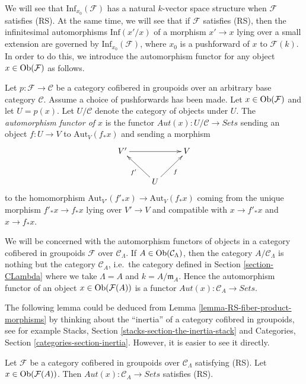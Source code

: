 \noindent
We will see that $\text{Inf}_{x_0}(\mathcal{F})$ has a natural $k$-vector
space structure when $\mathcal{F}$ satisfies (RS). At the same time, we will
see that if $\mathcal{F}$ satisfies (RS), then the infinitesimal automorphisms
$\text{Inf}(x'/x)$ of a morphism $x' \to x$ lying over a small
extension are governed by $\text{Inf}_{x_0}(\mathcal{F})$, where $x_0$ is
a pushforward of $x$ to $\mathcal{F}(k)$. In order to do this, we introduce
the automorphism functor for any object $x \in \mathop{\mathrm{Ob}}\nolimits(\mathcal{F})$ as
follows.

\begin{definition}
\label{definition-automorphism-functor}
Let $p : \mathcal{F} \to \mathcal{C}$ be a category cofibered in groupoids
over an arbitrary base category $\mathcal{C}$. Assume a choice of pushforwards
has been made. Let $x \in \mathop{\mathrm{Ob}}\nolimits(\mathcal{F})$ and let $U = p(x)$.
Let $U/\mathcal{C}$ denote the category of objects under $U$. The
{\it automorphism functor of $x$} is the functor
$\mathit{Aut}(x) : U/\mathcal{C} \to \textit{Sets}$ sending an object
$f : U \to V$ to $\text{Aut}_V(f_*x)$ and sending a morphism
$$
\xymatrix{
V' \ar[rr] &                    & V\\
          & U \ar[ul]^{f'}  \ar[ur]_f &
}
$$
to the homomorphism
$\text{Aut}_{V'}(f'_*x) \to \text{Aut}_V(f_*x)$
coming from the unique morphism $f'_*x \to f_*x$ lying over
$V' \to V$ and compatible with $x \to f'_*x$ and $x \to f_*x$.
\end{definition}

\noindent
We will be concerned with the automorphism functors of objects in a category
cofibered in groupoids $\mathcal{F}$ over $\mathcal{C}_\Lambda$. If
$A \in \mathop{\mathrm{Ob}}\nolimits(\mathcal{C}_\Lambda)$, then the category
$A/\mathcal{C}_\Lambda$ is nothing but the category $\mathcal{C}_A$,
i.e.\ the category defined in Section \ref{section-CLambda}
where we take $\Lambda = A$ and $k = A/\mathfrak m_A$.
Hence the automorphism functor of an object
$x \in \mathop{\mathrm{Ob}}\nolimits(\mathcal{F}(A))$ is a functor
$\mathit{Aut}(x) : \mathcal{C}_A \to \textit{Sets}$.

\medskip\noindent
The following lemma could be deduced from
Lemma \ref{lemma-RS-fiber-product-morphisms}
by thinking about the ``inertia'' of a category cofibred in groupoids,
see for example
Stacks, Section \ref{stacks-section-the-inertia-stack}
and
Categories, Section \ref{categories-section-inertia}.
However, it is easier to see it directly.

\begin{lemma}
\label{lemma-Aut-functor-RS}
Let $\mathcal{F}$ be a category cofibered in groupoids over
$\mathcal{C}_\Lambda$ satisfying (RS). Let
$x \in \mathop{\mathrm{Ob}}\nolimits(\mathcal{F}(A))$. Then
$\mathit{Aut}(x): \mathcal{C}_A \to \textit{Sets}$ satisfies (RS).
\end{lemma}

